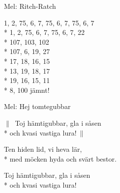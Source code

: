 \pagestyle{Tungrullare}
\begin{SongText}[Siffervisan]
    \begin{SongInfo}
        Mel: Ritch-Ratch
    \end{SongInfo}
    \begin{SongVerse}
        1, 2, 75, 6, 7, 75, 6, 7, 75, 6, 7\\*%
        1, 2, 75, 6, 7, 75, 6, 7, 22\\*%
        107, 103, 102\\*%
        107, 6, 19, 27\\*%
        17, 18, 16, 15\\*%
        13, 19, 18, 17\\*%
        19, 16, 15, 11\\*%
        8, 100 jämnt!
    \end{SongVerse}
\end{SongText}
\begin{SongText}
    \begin{SongInfo}
        Mel: Hej tomtegubbar
    \end{SongInfo}
    \begin{SongVerse}
        $\|\:$ Toj hämtigubbar, gla i såsen\\*%
        och kvasi vastiga lura!$\:\|$
    \end{SongVerse}
    \begin{SongVerse}
        Ten hiden lid, vi heva lär,\\*%
        med möcken hyda och svärt bestor.
    \end{SongVerse}
    \begin{SongVerse}
        Toj hämtigubbar, gla i såsen\\*%
        och kvasi vastiga lura!
    \end{SongVerse}
\end{SongText}
